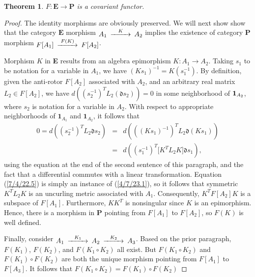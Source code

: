 \documentclass{amsart}
\numberwithin{equation}{section}
\newtheorem{theorem}{Theorem}
\theoremstyle{definition}
\numberwithin{theorem}{section}
\begin{document}
\begin{theorem}\label{6/13/22.1}  $F: \mathbf{E}\rightarrow \mathbf{P}$ is a covariant functor. 
 \end{theorem}
 \begin{proof}  The identity morphisms are obviously preserved.
We will next show show that the category $\mathbf{E}$ morphism $ \begin{CD}  A_1 @>K>> A_2\end{CD}$ implies the existence of category {\bf P} morphism $ \begin{CD}  F[A_1] @>F(K)>> F[A_2]\end{CD}$.

Morphism $K$ in {\bf E} results from an algebra epimorphism $K:A_1\rightarrow A_2$.   Taking $s_1$ to be notation for a variable in $A_1$, we have $(Ks_1)^{-1} = K(s_1^{-1})$.  By definition, given the anti-rotor $F[A_2]$ associated with $A_2$, and an arbitrary real matrix  $L_2 \in F[A_2]$, we have $d\left((s_2^{-1})^TL_2 (\mathfrak{d}s_2)\right) = 0$ in some neighborhood of ${\bf 1}_{A_2}$, where $s_2$ is notation for a variable in $A_2$.   With respect to appropriate neighborhoods of $\mathbf{1}_{A_1}$ and $\mathbf{1}_{A_2}$, it follows that \begin{eqnarray}\nonumber 0 = d\left((s_2^{-1})^TL_2 \mathfrak{d}s_2\right) &=&  d\left(((Ks_1)^{-1})^TL_2 \mathfrak{d}(Ks_1)\right) \\  &=& d\left((s_1^{-1})^T \big[K^T L_2K\big]\mathfrak{d}s_1\right), \label{7/4/22.5}  \end{eqnarray}   using the equation at the end of the second sentence of this paragraph, and the fact that a differential commutes with a linear transformation.  Equation (\ref{7/4/22.5}) is simply an instance of (\ref{4/7/23.1}), so it follows that symmetric $K^T L_2K$ is an uncurling metric associated with $A_1$.  
 Consequently, $K^TF[A_2]K$ is a subspace of $F[A_1]$.  Furthermore, $KK^T$ is nonsingular since $K$ is an epimorphism.  Hence, there is a morphism in {\bf P} pointing from $F[A_1]$ to $F[A_2]$, so $F(K)$ is well defined.

Finally, consider $\begin{CD}  A_1 @>K_1>> A_2 @>K_2>> A_3 \end{CD}$.  Based on the prior paragraph, $F(K_1)$, $F(K_2)$, and $F(K_1\circ K_2)$ all exist.  But $F(K_1\circ K_2)$ and  $F(K_1)\circ F(K_2)$ are both the unique morphism pointing from $F[A_1]$ to $F[A_3]$.  It follows that $F(K_1\circ K_2) = F(K_1)\circ F(K_2)$
\end{proof}
\end{document}
